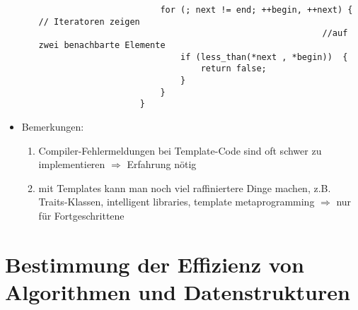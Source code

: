\documentclass{article}
\begin{document}
\begin{itemize}
\begin{itemize}
\begin{lstlisting}
						for (; next != end; ++begin, ++next) {  // Iteratoren zeigen 
														//auf zwei benachbarte Elemente
							if (less_than(*next , *begin))	{
								return false;
							}
						}
					}
			\end{lstlisting}
		\end{itemize}
		\item Bemerkungen:
		\begin{enumerate}
			\item Compiler-Fehlermeldungen bei Template-Code sind oft schwer zu implementieren $\Rightarrow$ Erfahrung nötig
			\item mit Templates kann man noch viel raffiniertere Dinge machen, z.B. Traits-Klassen, intelligent libraries, template metaprogramming $\Rightarrow$ nur für Fortgeschrittene
		\end{enumerate}
	\end{itemize}
	
	\section{Bestimmung der Effizienz von Algorithmen und Datenstrukturen}
	
\end{document}
